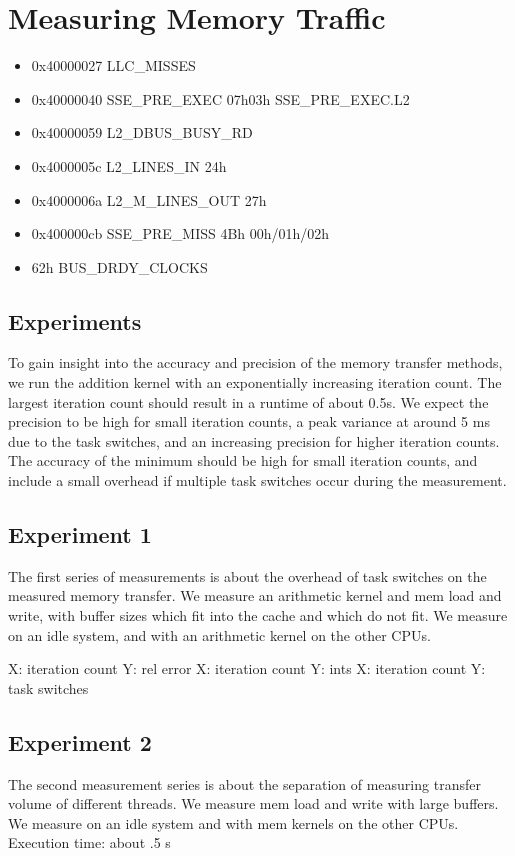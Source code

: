 \documentclass[a4paper,12pt]{article}
\begin{document}
\section{Measuring Memory Traffic}
\begin{itemize}
\item 0x40000027   LLC\_MISSES
\item 0x40000040   SSE\_PRE\_EXEC 07h03h SSE\_PRE\_EXEC.L2
\item 0x40000059   L2\_DBUS\_BUSY\_RD
\item 0x4000005c   L2\_LINES\_IN  24h
\item 0x4000006a   L2\_M\_LINES\_OUT  27h
\item 0x400000cb   SSE\_PRE\_MISS 4Bh 00h/01h/02h
\item 62h BUS\_DRDY\_CLOCKS
\end{itemize}

\subsection{Experiments}
To gain insight into the accuracy and precision of the memory transfer methods, we run the addition kernel with an exponentially increasing iteration count. The largest iteration count should result in a runtime of about 0.5s. We expect the precision to be high for small iteration counts, a peak variance at around 5 ms due to the task switches, and an increasing precision for higher iteration counts. The accuracy of the minimum should be high for small iteration counts, and include a small overhead if multiple task switches occur during the measurement.

\subsection{Experiment 1}
The first series of measurements is about the overhead of task switches on the measured memory transfer. We measure an arithmetic kernel and mem load and write, with buffer sizes which fit into the cache and which do not fit. We measure on an idle system, and with an arithmetic kernel on the other CPUs.

X: iteration count Y: rel error 
X: iteration count Y: ints
X: iteration count Y: task switches

\subsection{Experiment 2}
The second measurement series is about the separation of measuring transfer volume of different threads. We measure mem load and write with large buffers. We measure on an idle system and with mem kernels on the other CPUs. Execution time: about .5 s
\end{document}
